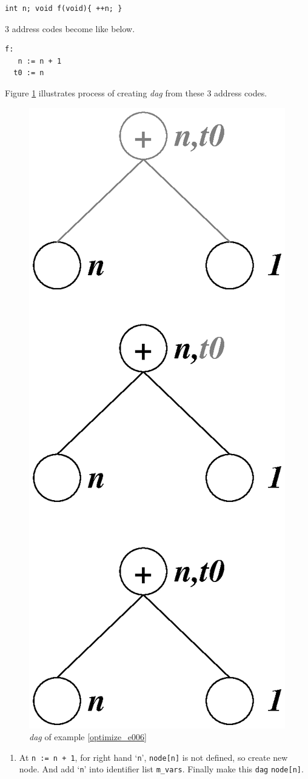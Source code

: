\begin{Example}
\label{optimize_e006}
\begin{verbatim}
int n; void f(void){ ++n; }
\end{verbatim}
3 address codes become like below.
\begin{verbatim}
f:
   n := n + 1
  t0 := n
\end{verbatim}
Figure \ref{optimize_e005} illustrates
process of creating {\em dag} from these 3 address codes.
\begin{figure}[htbp]
\begin{center}
\includegraphics[width=0.5\linewidth,height=1.01\linewidth]{opt000.eps}
\caption{{\em dag} of example \ref{optimize_e006}}
\label{optimize_e005}
\end{center}
\end{figure}

\begin{enumerate}
\item At {\tt{n := n + 1}}, for right hand `{\tt{n}}', 
{\tt{node[n]}} is not defined, so create new node. And
add `{\tt{n}}' into identifier list {\tt{m\_vars}}.
Finally make this {\tt{dag}} {\tt{node[n]}}.


\end{enumerate}
\end{Example}
